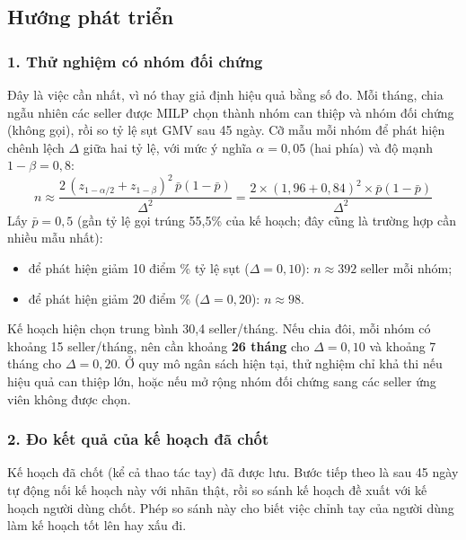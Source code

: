 \subsection{Hướng phát triển}
\subsubsection*{1. Thử nghiệm có nhóm đối chứng}
Đây là việc cần nhất, vì nó thay giả định hiệu quả bằng số đo. Mỗi tháng, chia ngẫu nhiên các seller được MILP chọn thành nhóm can thiệp và nhóm đối chứng (không gọi), rồi so tỷ lệ sụt GMV sau 45 ngày. Cỡ mẫu mỗi nhóm để phát hiện chênh lệch $\Delta$ giữa hai tỷ lệ, với mức ý nghĩa $\alpha = 0{,}05$ (hai phía) và độ mạnh $1-\beta = 0{,}8$:
\begin{equation}
n \approx \frac{2\,(z_{1-\alpha/2} + z_{1-\beta})^2\, \bar p(1-\bar p)}{\Delta^2} = \frac{2 \times (1{,}96 + 0{,}84)^2 \times \bar p(1-\bar p)}{\Delta^2}
\end{equation}
Lấy $\bar p = 0{,}5$ (gần tỷ lệ gọi trúng 55,5\% của kế hoạch; đây cũng là trường hợp cần nhiều mẫu nhất):
\begin{itemize}
    \item để phát hiện giảm 10 điểm \% tỷ lệ sụt ($\Delta = 0{,}10$): $n \approx 392$ seller mỗi nhóm;
    \item để phát hiện giảm 20 điểm \% ($\Delta = 0{,}20$): $n \approx 98$.
\end{itemize}
Kế hoạch hiện chọn trung bình 30,4 seller/tháng. Nếu chia đôi, mỗi nhóm có khoảng 15 seller/tháng, nên cần khoảng \textbf{26 tháng} cho $\Delta = 0{,}10$ và khoảng 7 tháng cho $\Delta = 0{,}20$. Ở quy mô ngân sách hiện tại, thử nghiệm chỉ khả thi nếu hiệu quả can thiệp lớn, hoặc nếu mở rộng nhóm đối chứng sang các seller ứng viên không được chọn.

\subsubsection*{2. Đo kết quả của kế hoạch đã chốt}
Kế hoạch đã chốt (kể cả thao tác tay) đã được lưu. Bước tiếp theo là sau 45 ngày tự động nối kế hoạch này với nhãn thật, rồi so sánh kế hoạch đề xuất với kế hoạch người dùng chốt. Phép so sánh này cho biết việc chỉnh tay của người dùng làm kế hoạch tốt lên hay xấu đi.

